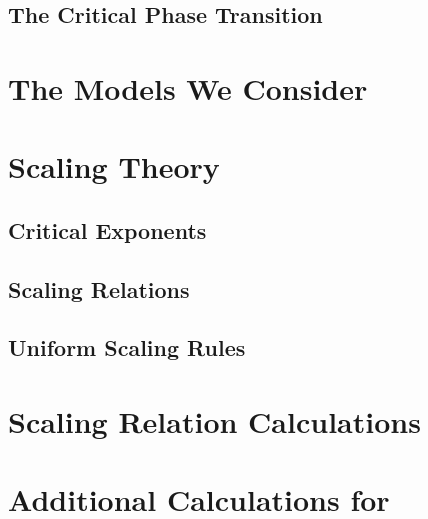 \documentclass[twoside,10pt]{article}
\begin{document}
\subsection{The Critical Phase Transition}

\section{The Models We Consider}

\section{Scaling Theory}

\subsection{Critical Exponents}

\subsection{Scaling Relations}

\subsection{Uniform Scaling Rules}

\section{Scaling Relation Calculations}

\section{Additional Calculations for \texorpdfstring{\ER}{Erdos Renyi}}


\end{document}
